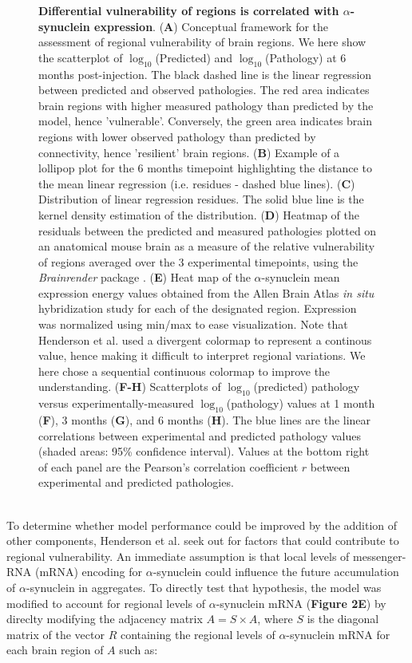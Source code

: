 \begin{figure}[!h]
    \caption{
      \textbf{Differential vulnerability of regions is correlated with $\alpha$-synuclein expression}.
        (\textbf{A}) Conceptual framework for the assessment of regional vulnerability of brain regions. We here show the scatterplot of $\log_{10}$(Predicted) and  $\log_{10}$(Pathology) at 6 months post-injection. The black dashed line is the linear regression between predicted and observed pathologies. The red area indicates brain regions with higher measured pathology than predicted by the model, hence 'vulnerable'. Conversely, the green area indicates brain regions with lower observed pathology than predicted by connectivity, hence 'resilient' brain regions.
        (\textbf{B}) Example of a lollipop plot for the 6 months timepoint highlighting the distance to the mean linear regression (i.e. residues - dashed blue lines).
        (\textbf{C}) Distribution of linear regression residues. The solid blue line is the kernel density estimation of the distribution. 
        (\textbf{D}) Heatmap of the residuals between the predicted and measured pathologies plotted on an anatomical mouse brain as a measure of the relative vulnerability of regions averaged over the 3 experimental timepoints, using the  \textit{Brainrender} package \cite{Claudi_2021}.
        (\textbf{E}) Heat map of the $\alpha$-synuclein mean expression energy values obtained from the Allen Brain Atlas \textit{in situ} hybridization study for each of the designated region. Expression was normalized using min/max to ease visualization. Note that Henderson et al. used a divergent colormap to represent a continous value, hence making it difficult to interpret regional variations. We here chose a sequential continuous colormap to improve the understanding.
        (\textbf{F-H}) Scatterplots of $\log_{10}$(predicted) pathology versus experimentally-measured $\log_{10}$(pathology) values at 1 month (\textbf{F}), 3 months (\textbf{G}), and 6 months (\textbf{H}). The blue lines are the linear correlations between experimental and predicted pathology values (shaded areas: 95\% confidence interval). Values at the bottom right of each panel are the Pearson's correlation coefficient $r$ between experimental and predicted pathologies.}

\end{figure}

\\
To determine whether model performance could be improved by the addition of other components, Henderson et al. seek out for factors that could contribute to regional vulnerability. An immediate assumption is that local levels of messenger-RNA (mRNA) encoding for $\alpha$-synuclein could influence the future accumulation of $\alpha$-synuclein in aggregates. To directly test that hypothesis, the model was modified to account for regional levels of $\alpha$-synuclein mRNA (\textbf{Figure 2E}) by direclty modifying the adjacency matrix $A = S \times A$, where $S$ is the diagonal matrix of the vector $R$ containing the regional levels of $\alpha$-synuclein mRNA for each brain region of $A$ such as: 

